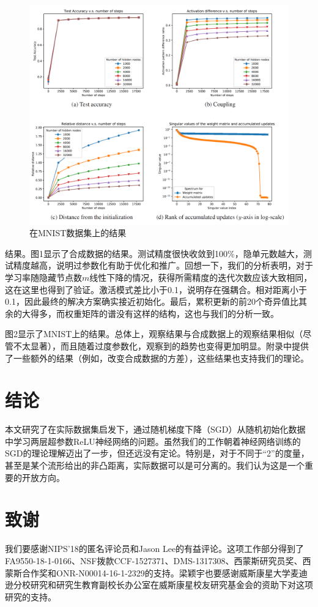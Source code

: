 \begin{figure}
\centering
\includegraphics[width=12cm]{./figures/mnist.png}
\caption{在MNIST数据集上的结果}
\end{figure}
\par
结果。图1显示了合成数据的结果。测试精度很快收敛到100\%，隐单元数越大，测试精度越高，说明过参数化有助于优化和推广。回想一下，我们的分析表明，对于学习率随隐藏节点数$m$线性下降的情况，获得所需精度的迭代次数应该大致相同，这在这里也得到了验证。激活模式差比小于0.1，说明存在强耦合。相对距离小于0.1，因此最终的解决方案确实接近初始化。最后，累积更新的前20个奇异值比其余的大得多，而权重矩阵的谱没有这样的结构，这也与我们的分析一致。
\par
图2显示了MNIST上的结果。总体上，观察结果与合成数据上的观察结果相似（尽管不太显著），而且随着过度参数化，观察到的趋势也变得更加明显。附录中提供了一些额外的结果（例如，改变合成数据的方差），这些结果也支持我们的理论。

\section{结论}
本文研究了在实际数据集启发下，通过随机梯度下降（SGD）从随机初始化数据中学习两层超参数ReLU神经网络的问题。虽然我们的工作朝着神经网络训练的SGD的理论理解迈出了一步，但还远没有定论。特别是，对于不同于“2”的度量，甚至是某个流形给出的非凸距离，实际数据可以是可分离的。我们认为这是一个重要的开放方向。

\section{致谢}
我们要感谢NIPS'18的匿名评论员和Jason Lee的有益评论。这项工作部分得到了FA9550-18-1-0166、NSF拨款CCF-1527371、DMS-1317308、西蒙斯研究员奖、西蒙斯合作奖和ONR-N00014-16-1-2329的支持。梁颖宇也要感谢威斯康星大学麦迪逊分校研究和研究生教育副校长办公室在威斯康星校友研究基金会的资助下对这项研究的支持。